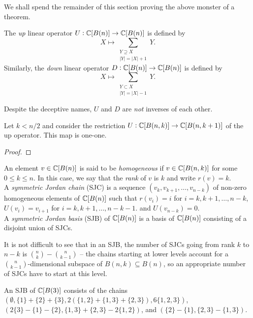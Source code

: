 	We shall spend the remainder of this section proving the above monster of a theorem.

	\begin{fdef}
		The \emph{up} linear operator $U : \mathbb{C}[B(n)] \to \mathbb{C}[B(n)]$ is defined by
		\[ X \mapsto \sum_{\substack{Y \supseteq X \\ |Y|=|X|+1}} Y. \]
		Similarly, the \emph{down} linear operator $D : \mathbb{C}[B(n)] \to \mathbb{C}[B(n)]$ is defined by
		\[ X \mapsto \sum_{\substack{Y \subset X \\ |Y|=|X|-1}} Y. \]
	\end{fdef}
	
	Despite the deceptive names, $U$ and $D$ are \emph{not} inverses of each other.

	\begin{flem}
		Let $k < n/2$ and consider the restriction $U : \mathbb{C}[B(n,k)] \to \mathbb{C}[B(n,k+1)]$ of the up operator. This map is one-one.
	\end{flem}
	\begin{proof}
		
	\end{proof}

	\begin{fdef}
		An element $v \in \mathbb{C}[B(n)]$ is said to be \emph{homogeneous} if $v \in \mathbb{C}[B(n,k)]$ for some $0 \le k \le n$. In this case, we say that the \emph{rank} of $v$ is $k$ and write $r(v) = k$.\\
		A \emph{symmetric Jordan chain} (SJC) is a sequence $(v_k,v_{k+1},\ldots,v_{n-k})$ of non-zero homogeneous elements of $\mathbb{C}[B(n)]$ such that $r(v_i) = i$ for $i = k,k+1,\ldots,n-k$, $U(v_i) = v_{i+1}$ for $i=k,k+1,\ldots,n-k-1$. and $U(v_{n-k}) = 0$.\\
		A \emph{symmetric Jordan basis} (SJB) of $\mathbb{C}[B(n)]$ is a basis of $\mathbb{C}[B(n)]$ consisting of a disjoint union of SJCs.
	\end{fdef}

	It is not difficult to see that in an SJB, the number of SJCs going from rank $k$ to $n-k$ is $\binom{n}{k}-\binom{n}{k-1}$ -- the chains starting at lower levels account for a $\binom{n}{k-1}$-dimensional subspace of $B(n,k) \subseteq B(n)$, so an appropriate number of SJCs have to start at this level.

	\begin{fex}
		An SJB of $\mathbb{C}[B(3)]$ consists of the chains $(\emptyset, \{1\}+\{2\}+\{3\}, 2(\{1,2\}+\{1,3\}+\{2,3\}), 6\{1,2,3\})$, $(2\{3\}-\{1\}-\{2\} , \{1,3\}+\{2,3\}-2\{1,2\})$, and $(\{2\}-\{1\} , \{2,3\} - \{1,3\})$.
	\end{fex}

